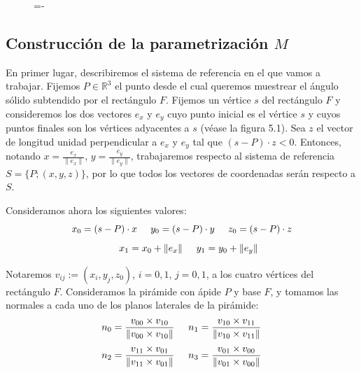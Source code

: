 \begin{figure}[h]
  \lineskip=-\fboxrule
\end{figure}

\subsection{Construcción de la parametrización $M$ }

En primer lugar, describiremos el sistema de referencia en el que vamos a trabajar. Fijemos $P\in\mathds{R}^3$ el punto desde el cual queremos muestrear el ángulo sólido subtendido por el rectángulo $F$. Fijemos un vértice $s$ del rectángulo $F$ y consideremos los dos vectores $e_x$ y $e_y$ cuyo punto inicial es el vértice $s$ y cuyos puntos finales son los vértices adyacentes a $s$ (véase la figura 5.1). Sea $z$ el vector de longitud unidad perpendicular a $e_x$ y $e_y$ tal que $(s-P)\cdot z < 0$. Entonces, notando $x=\frac{e_x}{\|e_x\|}$, $y=\frac{e_y}{\|e_y\|}$, trabajaremos respecto al sistema de referencia $S=\{P; (x, y, z)\}$, por lo que todos los vectores de coordenadas serán respecto a $S$.

Consideramos ahora los siguientes valores:
$$ x_0 = (s-P)\cdot x\hspace{0.5cm}y_0 = (s-P)\cdot y\hspace{0.5cm}z_0 = (s-P)\cdot z$$
$$\hspace{0.5cm}x_1 = x_0+\|e_x\|\hspace{0.5cm}y_1 = y_0+\|e_y\|$$

Notaremos $v_{ij} := (x_i,y_j,z_0)$, $i=0,1$, $j=0,1$, a los cuatro vértices del rectángulo $F$. Consideramos la pirámide con ápide $P$ y base $F$, y tomamos las normales a cada uno de los planos laterales de la pirámide:
$$ n_0 = \frac{v_{00}\times v_{10}}{\|v_{00}\times v_{10}\|}\hspace{0.5cm}n_1 = \frac{v_{10}\times v_{11}}{\|v_{10}\times v_{11}\|}$$
$$ n_2 = \frac{v_{11}\times v_{01}}{\|v_{11}\times v_{01}\|}\hspace{0.5cm}n_3 = \frac{v_{01}\times v_{00}}{\|v_{01}\times v_{00}\|}$$

